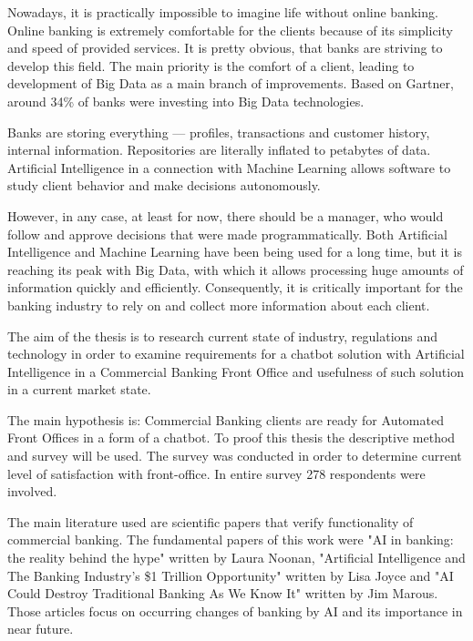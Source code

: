

Nowadays, it is practically impossible to imagine life without online banking. Online banking is extremely comfortable for the clients because of its simplicity and speed of provided services. 
It is pretty obvious, that banks are striving to develop this field. The main priority is the comfort of a client, leading to development of Big Data as a main branch of improvements. 
Based on Gartner, around 34\% of banks were investing into Big Data technologies. 

Banks are storing everything — profiles, transactions and customer history, internal information. 
Repositories are literally inflated to petabytes of data. 
Artificial Intelligence in a connection with Machine Learning allows software to study client behavior and make decisions autonomously. 

However, in any case, at least for now, there should be a manager, who would follow and approve decisions that were made programmatically. 
Both Artificial Intelligence and Machine Learning have been being used for a long time, but it is reaching its peak with Big Data, with which it allows processing huge amounts of information quickly and efficiently. 
Consequently, it is critically important for the banking industry to rely on and collect more information about each client. 

The aim of the thesis is to research current state of industry, regulations and technology in order to examine requirements for a chatbot solution with Artificial Intelligence in a Commercial Banking Front Office and usefulness of such solution in a current market state.

The main hypothesis is: Commercial Banking clients are ready for Automated Front Offices in a form of a chatbot.
To proof this thesis the descriptive method and survey will be used.
The survey was conducted in order to determine current level of satisfaction with front-office. 
In entire survey 278 respondents were involved. 

The main literature used are scientific papers that verify functionality of commercial banking. 
The fundamental papers of this work were "AI in banking: the reality behind the hype" written by Laura Noonan, "Artificial Intelligence and The Banking Industry’s \$1 Trillion Opportunity" written by Lisa Joyce and "AI Could Destroy Traditional Banking As We Know It" written by Jim Marous.
Those articles focus on occurring changes of banking by AI and its importance in near future. 

